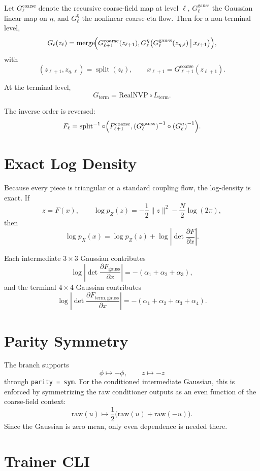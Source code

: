 \documentclass[11pt]{article}
\begin{document}
Let $G_\ell^{\mathrm{coarse}}$ denote the recursive coarse-field map at level
$\ell$, $G_\ell^{\mathrm{gauss}}$ the Gaussian linear map on $\eta$, and
$G_\ell^{\eta}$ the nonlinear coarse-eta flow. Then for a non-terminal level,
\[
G_\ell(z_\ell) =
\operatorname{merge}\!\Bigl(
G_{\ell+1}^{\mathrm{coarse}}(z_{\ell+1}),
G_\ell^{\eta}\bigl(
G_\ell^{\mathrm{gauss}}(z_{\eta,\ell}) \,\big|\, x_{\ell+1}
\bigr)
\Bigr),
\]
with
\[
(z_{\ell+1}, z_{\eta,\ell}) = \operatorname{split}(z_\ell),
\qquad
x_{\ell+1} = G_{\ell+1}^{\mathrm{coarse}}(z_{\ell+1}).
\]

At the terminal level,
\[
G_{\mathrm{term}} = \mathrm{RealNVP} \circ L_{\mathrm{term}}.
\]

The inverse order is reversed:
\[
F_\ell = \operatorname{split}^{-1} \circ
\Bigl(
F_{\ell+1}^{\mathrm{coarse}},
\left(G_\ell^{\mathrm{gauss}}\right)^{-1}
\circ
\left(G_\ell^{\eta}\right)^{-1}
\Bigr).
\]

\section{Exact Log Density}

Because every piece is triangular or a standard coupling flow, the log-density
is exact. If
\[
z = F(x), \qquad \log p_Z(z) = -\frac12 \|z\|^2 - \frac{N}{2}\log(2\pi),
\]
then
\[
\log p_X(x) = \log p_Z(z) + \log \left| \det \frac{\partial F}{\partial x} \right|.
\]

Each intermediate $3 \times 3$ Gaussian contributes
\[
\log \left| \det \frac{\partial F_{\mathrm{gauss}}}{\partial x} \right|
= -(\alpha_1 + \alpha_2 + \alpha_3),
\]
and the terminal $4 \times 4$ Gaussian contributes
\[
\log \left| \det \frac{\partial F_{\mathrm{term,gauss}}}{\partial x} \right|
= -(\alpha_1 + \alpha_2 + \alpha_3 + \alpha_4).
\]

\section{Parity Symmetry}

The branch supports
\[
\phi \mapsto -\phi, \qquad z \mapsto -z
\]
through \texttt{parity = sym}. For the conditioned intermediate Gaussian, this
is enforced by symmetrizing the raw conditioner outputs as an even function of
the coarse-field context:
\[
\mathrm{raw}(u) \mapsto \frac12 \bigl(\mathrm{raw}(u) + \mathrm{raw}(-u)\bigr).
\]
Since the Gaussian is zero mean, only even dependence is needed there.

\section{Trainer CLI}
\end{document}
